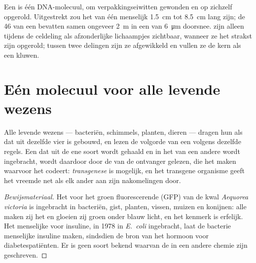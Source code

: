 \begin{proposition}[Chromosomen]\label{prop:g10:universal-dna:chromosome}
Een  is één DNA-molecuul, om verpakkingseiwitten gewonden en
op zichzelf opgerold. Uitgestrekt zou het  van één menselijk
 \qty{1.5}{cm} tot \qty{8.5}{cm} lang zijn; de 46 
van een  bevatten samen ongeveer \qty{2}{m}  in een  van
\qty{6}{\micro m} doorsnee.  zijn alleen tijdens de celdeling
als afzonderlijke lichaampjes zichtbaar, wanneer ze het strakst zijn
opgerold; tussen twee delingen zijn ze afgewikkeld en vullen ze de kern
als een kluwen.
\end{proposition}
\admitted

\section{Eén molecuul voor alle levende wezens}

\begin{proposition}\label{prop:g10:universal-dna:universal}
Alle levende wezens --- bacteriën, schimmels, planten, dieren --- dragen
hun  als  dat uit dezelfde vier  is
gebouwd, en lezen de volgorde van een  volgens dezelfde regels. Een
 dat uit de ene soort wordt gehaald en in het  van een andere
wordt ingebracht, wordt daardoor door de  van de ontvanger
gelezen, die het  maken waarvoor het codeert:
\emph{transgenese} is mogelijk, en het transgene
organisme geeft het vreemde  net als elk ander aan zijn nakomelingen
door.
\end{proposition}
\begin{proof}[Bewijsmateriaal]
Het  voor het groen fluorescerende  (GFP) van de kwal
\emph{Aequorea victoria} is ingebracht in bacteriën, gist, planten,
vissen, muizen en konijnen: alle maken zij het  en gloeien zij
groen onder blauw licht, en het kenmerk is erfelijk. Het menselijke 
voor insuline, in 1978 in \emph{E.~coli} ingebracht, laat de bacterie
menselijke insuline maken, sindsdien de bron van het hormoon voor
diabetespatiënten. Er is geen soort bekend waarvan de  in een
andere chemie zijn geschreven.
\end{proof}

